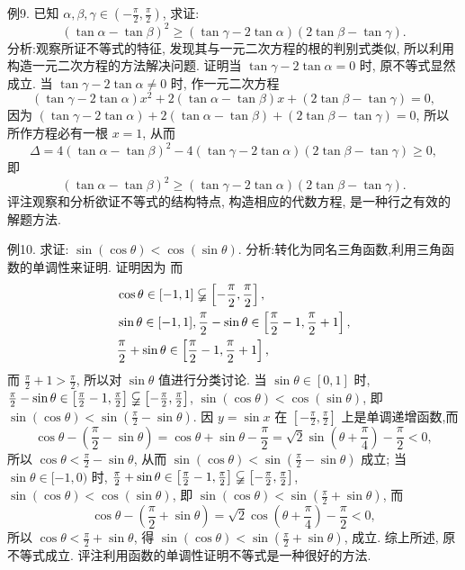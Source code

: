 例9. 已知 $\alpha, \beta, \gamma \in\left(-\frac{\pi}{2}, \frac{\pi}{2}\right)$, 求证:
$$
(\tan \alpha-\tan \beta)^2 \geqslant(\tan \gamma-2 \tan \alpha)(2 \tan \beta-\tan \gamma) .
$$
分析:观察所证不等式的特征, 发现其与一元二次方程的根的判别式类似, 所以利用构造一元二次方程的方法解决问题.
证明当 $\tan \gamma-2 \tan \alpha=0$ 时, 原不等式显然成立.
当 $\tan \gamma-2 \tan \alpha \neq 0$ 时, 作一元二次方程
$$
(\tan \gamma-2 \tan \alpha) x^2+2(\tan \alpha-\tan \beta) x+(2 \tan \beta-\tan \gamma)=0,
$$
因为 $(\tan \gamma-2 \tan \alpha)+2(\tan \alpha-\tan \beta)+(2 \tan \beta-\tan \gamma)=0$,
所以所作方程必有一根 $x=1$, 从而
$$
\Delta=4(\tan \alpha-\tan \beta)^2-4(\tan \gamma-2 \tan \alpha)(2 \tan \beta-\tan \gamma) \geqslant 0,
$$
即
$$
(\tan \alpha-\tan \beta)^2 \geqslant(\tan \gamma-2 \tan \alpha)(2 \tan \beta-\tan \gamma) .
$$
评注观察和分析欲证不等式的结构特点, 构造相应的代数方程, 是一种行之有效的解题方法.



例10. 求证: $\sin (\cos \theta)<\cos (\sin \theta)$.
分析:转化为同名三角函数,利用三角函数的单调性来证明.
证明因为 而
$$
\begin{aligned}
& \cos \theta \in[-1,1] \varsubsetneqq\left[-\frac{\pi}{2}, \frac{\pi}{2}\right], \\
& \sin \theta \in[-1,1], \frac{\pi}{2}-\sin \theta \in\left[\frac{\pi}{2}-1, \frac{\pi}{2}+1\right], \\
& \frac{\pi}{2}+\sin \theta \in\left[\frac{\pi}{2}-1, \frac{\pi}{2}+1\right],
\end{aligned}
$$
而 $\frac{\pi}{2}+1>\frac{\pi}{2}$, 所以对 $\sin \theta$ 值进行分类讨论.
当 $\sin \theta \in[0,1]$ 时, $\frac{\pi}{2}-\sin \theta \in\left[\frac{\pi}{2}-1, \frac{\pi}{2}\right] \varsubsetneqq\left[-\frac{\pi}{2}, \frac{\pi}{2}\right]$, $\sin (\cos \theta)<\cos (\sin \theta)$, 即 $\sin (\cos \theta)<\sin \left(\frac{\pi}{2}-\sin \theta\right)$.
因 $y=\sin x$ 在 $\left[-\frac{\pi}{2}, \frac{\pi}{2}\right]$ 上是单调递增函数,而
$$
\cos \theta-\left(\frac{\pi}{2}-\sin \theta\right)=\cos \theta+\sin \theta-\frac{\pi}{2}=\sqrt{2} \sin \left(\theta+\frac{\pi}{4}\right)-\frac{\pi}{2}<0,
$$
所以 $\cos \theta<\frac{\pi}{2}-\sin \theta$, 从而 $\sin (\cos \theta)<\sin \left(\frac{\pi}{2}-\sin \theta\right)$ 成立;
当 $\sin \theta \in[-1,0)$ 时, $\frac{\pi}{2}+\sin \theta \in\left[\frac{\pi}{2}-1, \frac{\pi}{2}\right] \varsubsetneqq\left[-\frac{\pi}{2}, \frac{\pi}{2}\right]$, $\sin (\cos \theta)<\cos (\sin \theta)$, 即 $\sin (\cos \theta)<\sin \left(\frac{\pi}{2}+\sin \theta\right)$, 而
$$
\cos \theta-\left(\frac{\pi}{2}+\sin \theta\right)=\sqrt{2} \cos \left(\theta+\frac{\pi}{4}\right)-\frac{\pi}{2}<0,
$$
所以 $\cos \theta<\frac{\pi}{2}+\sin \theta$, 得 $\sin (\cos \theta)<\sin \left(\frac{\pi}{2}+\sin \theta\right)$, 成立.
综上所述, 原不等式成立.
评注利用函数的单调性证明不等式是一种很好的方法.



